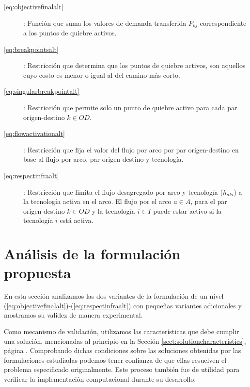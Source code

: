 \begin{description}
  \item[\ref{eq:objectivefinalalt}]: Función que suma los valores de demanda transferida $P_{kj}$ correspondiente a los puntos de quiebre activos.
  \item[\ref{eq:breakpointsalt}]: Restricción que determina que los puntos de quiebre activos, son aquellos cuyo costo es menor o igual al del camino más corto.
  \item[\ref{eq:singularbreakpointalt}]: Restricción que permite solo un punto de quiebre activo para cada par origen-destino $k \in OD$.
  \item[\ref{eq:flowactivationalt}]: Restricción que fija el valor del flujo por arco por par origen-destino en base al flujo por arco, par origen-destino y tecnología.
  \item[\ref{eq:respectinfraalt}]: Restricción que limita el flujo desagregado por arco y tecnología ($h_{aki}$) a la tecnología activa en el arco. El flujo por el arco $a \in A$, para el par origen-destino $k \in OD$ y la tecnología $i \in I$ puede estar activo si la tecnología $i$ está activa.
\end{description}

\section{Análisis de la formulación propuesta}
\label{sect:formulationanalysis}

En esta sección analizamos las dos variantes de la formulación de un nivel (\ref{eq:objectivefinalalt})-(\ref{eq:respectinfraalt}) con pequeñas variantes adicionales y mostramos su validez de manera experimental.

Como mecanismo de validación, utilizamos las características que debe cumplir una solución, mencionadas al principio en la Sección \ref{sect:solutioncharacteristics}, página \pageref{sect:solutioncharacteristics}. Comprobando dichas condiciones sobre las soluciones obtenidas por las formulaciones estudiadas podemos tener confianza de que ellas resuelven el problema especificado originalmente. Este proceso también fue de utilidad para verificar la implementación computacional durante su desarrollo.


